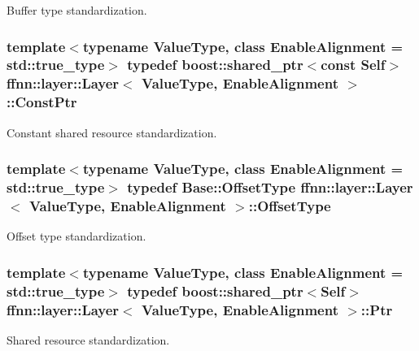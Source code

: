 Buffer type standardization. 

\hypertarget{classffnn_1_1layer_1_1_layer_a6a0d0adbe331d1682e79d0c734fd3c72}{
\subsubsection[{Const\-Ptr}]{\setlength{\rightskip}{0pt plus 5cm}template$<$typename Value\-Type, class Enable\-Alignment = std\-::true\-\_\-type$>$ typedef boost\-::shared\-\_\-ptr$<$const {\bf Self}$>$ {\bf ffnn\-::layer\-::\-Layer}$<$ Value\-Type, Enable\-Alignment $>$\-::{\bf Const\-Ptr}}}\label{classffnn_1_1layer_1_1_layer_a6a0d0adbe331d1682e79d0c734fd3c72}


Constant shared resource standardization. 

\hypertarget{classffnn_1_1layer_1_1_layer_a5ed88ceefa1814e88fbccfdded6c9999}{
\subsubsection[{Offset\-Type}]{\setlength{\rightskip}{0pt plus 5cm}template$<$typename Value\-Type, class Enable\-Alignment = std\-::true\-\_\-type$>$ typedef {\bf Base\-::\-Offset\-Type} {\bf ffnn\-::layer\-::\-Layer}$<$ Value\-Type, Enable\-Alignment $>$\-::{\bf Offset\-Type}}}\label{classffnn_1_1layer_1_1_layer_a5ed88ceefa1814e88fbccfdded6c9999}


Offset type standardization. 

\hypertarget{classffnn_1_1layer_1_1_layer_a0efb2ac9125e1fa8f905bd4eed765201}{
\subsubsection[{Ptr}]{\setlength{\rightskip}{0pt plus 5cm}template$<$typename Value\-Type, class Enable\-Alignment = std\-::true\-\_\-type$>$ typedef boost\-::shared\-\_\-ptr$<${\bf Self}$>$ {\bf ffnn\-::layer\-::\-Layer}$<$ Value\-Type, Enable\-Alignment $>$\-::{\bf Ptr}}}\label{classffnn_1_1layer_1_1_layer_a0efb2ac9125e1fa8f905bd4eed765201}


Shared resource standardization. 

